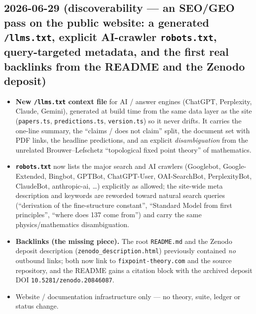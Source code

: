 \subsection*{2026-06-29 (discoverability --- an SEO/GEO pass on the public website: a generated \texttt{/llms.txt}, explicit AI-crawler \texttt{robots.txt}, query-targeted metadata, and the first real backlinks from the README and the Zenodo deposit)}
\begin{itemize}
\item \textbf{New \texttt{/llms.txt} context file} for AI / answer engines (ChatGPT, Perplexity, Claude,
Gemini), generated at build time from the same data layer as the site (\texttt{papers.ts},
\texttt{predictions.ts}, \texttt{version.ts}) so it never drifts. It carries the one-line summary, the
``claims / does not claim'' split, the document set with PDF links, the headline predictions, and an
explicit \emph{disambiguation} from the unrelated Brouwer--Lefschetz ``topological fixed point theory'' of
mathematics.
\item \textbf{\texttt{robots.txt}} now lists the major search and AI crawlers (Googlebot, Google-Extended,
Bingbot, GPTBot, ChatGPT-User, OAI-SearchBot, PerplexityBot, ClaudeBot, anthropic-ai, \dots) explicitly as
allowed; the site-wide meta description and keywords are reworded toward natural search queries
(``derivation of the fine-structure constant'', ``Standard Model from first principles'', ``where does 137
come from'') and carry the same physics/mathematics disambiguation.
\item \textbf{Backlinks (the missing piece).} The root \texttt{README.md} and the Zenodo deposit description
(\texttt{zenodo\_description.html}) previously contained \emph{no} outbound links; both now link to
\texttt{fixpoint-theory.com} and the source repository, and the README gains a citation block with the
archived deposit DOI \texttt{10.5281/zenodo.20846087}.
\item Website / documentation infrastructure only --- no theory, suite, ledger or status change.
\end{itemize}



